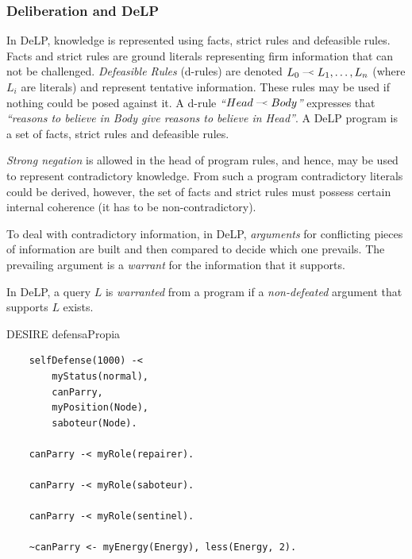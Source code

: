 

\subsubsection{Deliberation and DeLP}
    \newcommand{\drule}[2]{\mbox{$ #1\; \defleftarrow \; #2$}}
    \newcommand{\defleftarrow}{{\raise1.5pt\hbox{\tiny\defleft}}}
    \newcommand{\defleft}{\mbox{---\hspace{-1.5pt}\raise.05pt\hbox{$<$}}}
    In DeLP\cite{Garcia:2004a}, knowledge is represented using facts, strict rules
    and defeasible rules. Facts and strict rules are ground literals representing
    firm information that can not be challenged. \textit{Defeasible Rules}
    (d-rules) are denoted $\drule{L_0}{L_1, \ldots, L_n}$ (where $L_i$ are literals)
    and represent tentative information. These rules may be used if nothing could
    be posed against it. A d-rule \textit{``\drule{Head}{Body}''} expresses that
    \textit{``reasons to believe in Body give reasons to believe in Head''}. A DeLP
    program is a set of facts, strict rules and defeasible rules. 

    {\it Strong negation} is allowed in the head of program rules, and hence, may
    be used to represent contradictory knowledge. From such a program contradictory
    literals could be derived, however,  the set of facts and strict rules must
    possess certain internal coherence (it has to be non-contradictory). 

    To deal with contradictory information, in DeLP, \emph{arguments} for
    conflicting pieces of information are built and then compared to decide which
    one prevails. The prevailing argument is a \emph{warrant} for the information
    that it supports.

    In DeLP, a query $L$ is \emph{warranted} from a program if a \emph{non-defeated}
    argument that supports $L$ exists. %
    
    DESIRE defensaPropia
    
    \begin{small}
    \begin{Verbatim}
    selfDefense(1000) -<
        myStatus(normal),
        canParry,
        myPosition(Node),
        saboteur(Node).  

    canParry -< myRole(repairer).
        
    canParry -< myRole(saboteur).
        
    canParry -< myRole(sentinel).
        
    ~canParry <- myEnergy(Energy), less(Energy, 2). 
    \end{Verbatim}
    \end{small}
 
